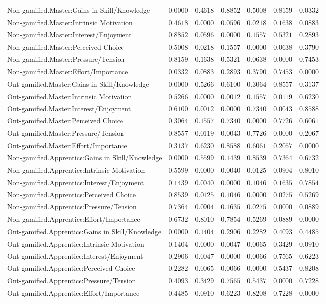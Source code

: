 \begin{landscape}
{\begin{longtable}{lrrrrrr}
Non-gamified.Master:Gains in Skill/Knowledge&$0.0000$&$0.4618$&$0.8852$&$0.5008$&$0.8159$&$0.0332$\tabularnewline
Non-gamified.Master:Intrinsic Motivation&$0.4618$&$0.0000$&$0.0596$&$0.0218$&$0.1638$&$0.0883$\tabularnewline
Non-gamified.Master:Interest/Enjoyment&$0.8852$&$0.0596$&$0.0000$&$0.1557$&$0.5321$&$0.2893$\tabularnewline
Non-gamified.Master:Perceived Choice&$0.5008$&$0.0218$&$0.1557$&$0.0000$&$0.0638$&$0.3790$\tabularnewline
Non-gamified.Master:Pressure/Tension&$0.8159$&$0.1638$&$0.5321$&$0.0638$&$0.0000$&$0.7453$\tabularnewline
Non-gamified.Master:Effort/Importance&$0.0332$&$0.0883$&$0.2893$&$0.3790$&$0.7453$&$0.0000$\tabularnewline
\hline

Ont-gamified.Master:Gains in Skill/Knowledge&$0.0000$&$0.5266$&$0.6100$&$0.3064$&$0.8557$&$0.3137$\tabularnewline
Ont-gamified.Master:Intrinsic Motivation&$0.5266$&$0.0000$&$0.0012$&$0.1557$&$0.0119$&$0.6230$\tabularnewline
Ont-gamified.Master:Interest/Enjoyment&$0.6100$&$0.0012$&$0.0000$&$0.7340$&$0.0043$&$0.8588$\tabularnewline
Ont-gamified.Master:Perceived Choice&$0.3064$&$0.1557$&$0.7340$&$0.0000$&$0.7726$&$0.6061$\tabularnewline
Ont-gamified.Master:Pressure/Tension&$0.8557$&$0.0119$&$0.0043$&$0.7726$&$0.0000$&$0.2067$\tabularnewline
Ont-gamified.Master:Effort/Importance&$0.3137$&$0.6230$&$0.8588$&$0.6061$&$0.2067$&$0.0000$\tabularnewline
\hline
\newpage

Non-gamified.Apprentice:Gains in Skill/Knowledge&$0.0000$&$0.5599$&$0.1439$&$0.8539$&$0.7364$&$0.6732$\tabularnewline
Non-gamified.Apprentice:Intrinsic Motivation&$0.5599$&$0.0000$&$0.0040$&$0.0125$&$0.0904$&$0.8010$\tabularnewline
Non-gamified.Apprentice:Interest/Enjoyment&$0.1439$&$0.0040$&$0.0000$&$0.1046$&$0.1635$&$0.7854$\tabularnewline
Non-gamified.Apprentice:Perceived Choice&$0.8539$&$0.0125$&$0.1046$&$0.0000$&$0.0275$&$0.5269$\tabularnewline
Non-gamified.Apprentice:Pressure/Tension&$0.7364$&$0.0904$&$0.1635$&$0.0275$&$0.0000$&$0.0889$\tabularnewline
Non-gamified.Apprentice:Effort/Importance&$0.6732$&$0.8010$&$0.7854$&$0.5269$&$0.0889$&$0.0000$\tabularnewline
\hline

Ont-gamified.Apprentice:Gains in Skill/Knowledge&$0.0000$&$0.1404$&$0.2906$&$0.2282$&$0.4093$&$0.4485$\tabularnewline
Ont-gamified.Apprentice:Intrinsic Motivation&$0.1404$&$0.0000$&$0.0047$&$0.0065$&$0.3429$&$0.0910$\tabularnewline
Ont-gamified.Apprentice:Interest/Enjoyment&$0.2906$&$0.0047$&$0.0000$&$0.0066$&$0.7565$&$0.6223$\tabularnewline
Ont-gamified.Apprentice:Perceived Choice&$0.2282$&$0.0065$&$0.0066$&$0.0000$&$0.5437$&$0.8208$\tabularnewline
Ont-gamified.Apprentice:Pressure/Tension&$0.4093$&$0.3429$&$0.7565$&$0.5437$&$0.0000$&$0.7228$\tabularnewline
Ont-gamified.Apprentice:Effort/Importance&$0.4485$&$0.0910$&$0.6223$&$0.8208$&$0.7228$&$0.0000$\tabularnewline
\hline

\end{longtable}}\end{landscape}



